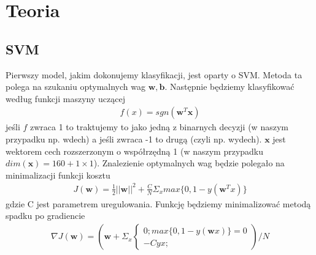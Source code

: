 \documentclass{article}
\begin{document}
\section{Teoria}
\subsection{SVM}
Pierwszy model, jakim dokonujemy klasyfikacji, jest oparty o SVM. Metoda ta polega na szukaniu optymalnych wag $\boldsymbol{w}, \boldsymbol{b}$.
Następnie będziemy klasyfikować według funkcji maszyny uczącej 
\begin{gather*}
	f(x) = sgn(\boldsymbol{w}^T \boldsymbol{x})
\end{gather*}
jeśli $f$ zwraca 1 to traktujemy to jako jedną z binarnych decyzji (w naszym przypadku np. wdech) a jeśli zwraca -1 to drugą (czyli np. wydech).
$\textbf{x}$ jest wektorem cech rozszerzonym o współrzędną 1 (w naszym przypadku $dim(\textbf{x}) = 160 + 1 \times 1$).  Znalezienie optymalnych wag będzie polegało na minimalizacji
funkcji kosztu
\begin{gather*}
	J(\boldsymbol{w}) = \frac{1}{2}||\boldsymbol{w}||^2 + \frac{C}{N}\Sigma_x max\{0, 1 - y(\boldsymbol{w}^Tx)\}
\end{gather*}
gdzie C jest parametrem uregulowania. Funkcję będziemy minimalizować metodą spadku po gradiencie
\begin{gather*}
	\nabla J(\boldsymbol{w}) =( \boldsymbol{w} + \Sigma_x \begin{cases}
		0; max\{0, 1 - y (\boldsymbol{w}x)\} = 0 \\
		-Cyx; 
	\end{cases})/N
\end{gather*}
\end{document}
